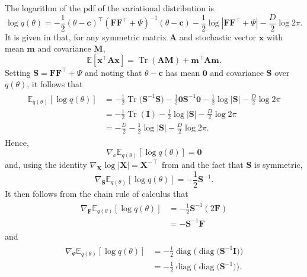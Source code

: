 \documentclass[msc,deptreport.inf]{infthesis} %
\newcommand{\matr}[1]{\mathbf{#1}}
\newcommand{\E}{\mathbb E}
\newcommand{\diag}{\mathop{\mathrm{diag}}}
\newcommand{\tr}{\mathop{\mathrm{Tr}}}
\begin{document}
The logarithm of the pdf of the variational distribution is
\begin{equation}
	\log q(\theta)
	= -\frac{1}{2} (\theta - \matr{c})^\intercal (\matr{FF}^{\intercal} + \Psi)^{-1} (\theta - \matr{c})  
	- \frac{1}{2} \log |\matr{FF}^{\intercal} + \Psi| 
	- \frac{D}{2} \log 2\pi.
\end{equation}
It is given in \cite{petersen2012} that, for any symmetric matrix $\matr{A}$ and stochastic vector $\matr{x}$ with mean $\matr{m}$ and covariance $\matr{M}$,
\begin{equation}\label{eqn:expectation_xTAx}
	\E [\matr{x}^\intercal \matr{A} \matr{x}] = \tr(\matr{A}\matr{M}) + \matr{m}^\intercal \matr{A} \matr{m}.
\end{equation}
Setting $\matr{S} = \matr{FF}^{\intercal} + \Psi$ and noting that $\theta - \matr{c}$ has mean $\matr{0}$ and covariance $\matr{S}$ over $q(\theta)$, it follows that
\begin{align}
\begin{split}\label{eqn:expectation_of_vi_dist}
	\E_{q(\theta)}[\log q(\theta)]
	& = -\frac{1}{2} \tr\big(\matr{S}^{-1} \matr{S} \big) -\frac{1}{2} \matr{0} \matr{S}^{-1} \matr{0} 
	- \frac{1}{2} \log |\matr{S}| - \frac{D}{2} \log 2\pi \\
	& = -\frac{1}{2}\tr(\matr{I}) - \frac{1}{2} \log |\matr{S}| - \frac{D}{2} \log 2\pi \\
	& = -\frac{D}{2}  - \frac{1}{2} \log |\matr{S}| - \frac{D}{2} \log 2\pi.
\end{split}
\end{align}
Hence, 
\begin{equation}
	\nabla_\matr{c} \E_{q(\theta)} [\log q(\theta)] = \matr{0}
\end{equation}
and, using the identity $\nabla_\matr{X} \log |\matr{X}| = \matr{X}^{-\intercal}$ from \cite{petersen2012} and the fact that $\matr{S}$ is symmetric,
\begin{equation}
	\nabla_\matr{S} \E_{q(\theta)} [\log q(\theta)] = -\frac{1}{2} \matr{S}^{-1}.
\end{equation}
It then follows from the chain rule of calculus that
\begin{align}
\begin{split}\label{eqn:grad_vi_dist_wrt_F}
	\nabla_\matr{F} \E_{q(\theta)} [\log q(\theta)]
	& = -\frac{1}{2} \matr{S}^{-1} (2\matr{F}) \\
	& = -\matr{S}^{-1}\matr{F}
\end{split}
\end{align}
and
\begin{align}
\begin{split}\label{eqn:grad_vi_dist_wrt_Psi}
	\nabla_\Psi \E_{q(\theta)} [\log q(\theta)]
	& = -\frac{1}{2} \diag\big(\diag\big(\matr{S}^{-1} \matr{I}\big)\big) \\
	& = -\frac{1}{2} \diag\big(\diag\big(\matr{S}^{-1}\big)\big).
\end{split}
\end{align}
\end{document}
